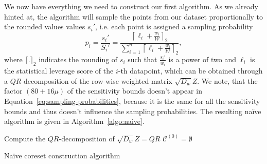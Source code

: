 We now have everything we need to construct our first algorithm.
As we already hinted at, the algorithm will sample the points
from our dataset proportionally to the rounded values values
$s_i'$, i.e. each point is assigned a sampling probability
\begin{equation}
    \label{eq:sampling-probabilities}
    p_i = \frac{s_i'}{S_i'} =
    \frac{\left\lceil \ell_i + \frac{w_i}{\mathcal{W}} \right\rceil_2}
    {\sum_{i=1}^n \left\lceil \ell_i + \frac{w_i}{\mathcal{W}} \right\rceil_2},
\end{equation}
where $\lceil . \rceil_2$ indicates the rounding of $s_i$ such that
$\frac{s_i'}{w_i}$ is a power of two and $\ell_i$ is the statistical
leverage score of the $i$-th datapoint, which can be obtained through
a $QR$ decomposition of the row-wise weighted matrix $\sqrt{D_w}Z$.
We note, that the factor $(80 + 16\mu)$ of the sensitivity
bounds doesn't appear in
Equation~\ref{eq:sampling-probabilities}, because it is the
same for all the sensitivity bounds and thus doesn't influence
the sampling probabilities.
The resulting na\"ive algorithm is given in Algorithm~\ref{algo:naive}.

\begin{algorithm}[t!]
    \DontPrintSemicolon
    Compute the $QR$-decomposition of $\sqrt{D_w}Z = QR$ \;
    $\mathcal{C}^{(0)} = \emptyset$ \;
    \caption{Na\"ive coreset construction algorithm\label{algo:naive}}
\end{algorithm}

